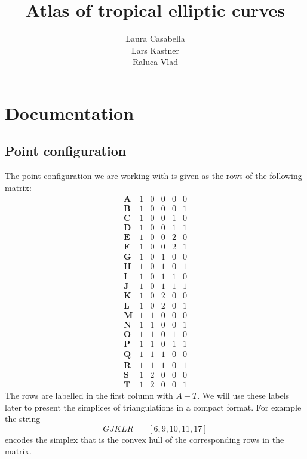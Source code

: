 \documentclass[a4paper, DIV=17, twocolumn]{scrartcl}
\title{Atlas of tropical elliptic curves}
\author{Laura Casabella\\Lars Kastner\\Raluca Vlad}
\begin{document}
\maketitle
\tableofcontents
\section{Documentation}
\subsection{Point configuration}
The point configuration we are working with is given as the rows of the following matrix:
\[
   \begin{array}{c|ccccc}
      \textbf{A} & 1 & 0 & 0 & 0 & 0\\
      \textbf{B} & 1 & 0 & 0 & 0 & 1\\
      \textbf{C} & 1 & 0 & 0 & 1 & 0\\
      \textbf{D} & 1 & 0 & 0 & 1 & 1\\
      \textbf{E} & 1 & 0 & 0 & 2 & 0\\
      \textbf{F} & 1 & 0 & 0 & 2 & 1\\
      \textbf{G} & 1 & 0 & 1 & 0 & 0\\
      \textbf{H} & 1 & 0 & 1 & 0 & 1\\
      \textbf{I} & 1 & 0 & 1 & 1 & 0\\
      \textbf{J} & 1 & 0 & 1 & 1 & 1\\
      \textbf{K} & 1 & 0 & 2 & 0 & 0\\
      \textbf{L} & 1 & 0 & 2 & 0 & 1\\
      \textbf{M} & 1 & 1 & 0 & 0 & 0\\
      \textbf{N} & 1 & 1 & 0 & 0 & 1\\
      \textbf{O} & 1 & 1 & 0 & 1 & 0\\
      \textbf{P} & 1 & 1 & 0 & 1 & 1\\
      \textbf{Q} & 1 & 1 & 1 & 0 & 0\\
      \textbf{R} & 1 & 1 & 1 & 0 & 1\\
      \textbf{S} & 1 & 2 & 0 & 0 & 0\\
      \textbf{T} & 1 & 2 & 0 & 0 & 1
   \end{array}
\]
The rows are labelled in the first column with $A-T$. We will use these
labels later to present the simplices of triangulations in a compact format. For
example the string
\[
GJKLR\ =\ [6,9,10,11,17]
\]
encodes the simplex that is the convex hull of the corresponding rows in the
matrix.
\end{document}

